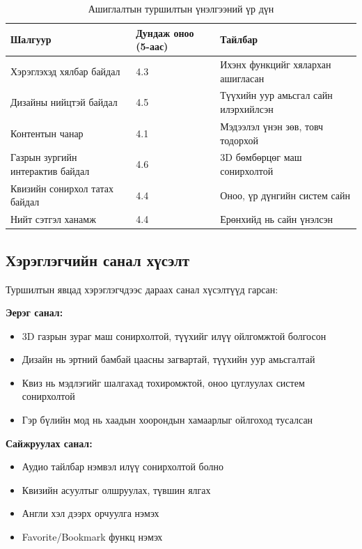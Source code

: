 \begin{table}[htbp]
\centering
\begin{tabular}{|p{5cm}|p{2.5cm}|p{6cm}|}
\hline
\textbf{Шалгуур} & \textbf{Дундаж оноо (5-аас)} & \textbf{Тайлбар} \\
\hline
Хэрэглэхэд хялбар байдал & 4.3 & Ихэнх функцийг хялархан ашигласан \\
\hline
Дизайны нийцтэй байдал & 4.5 & Түүхийн уур амьсгал сайн илэрхийлсэн \\
\hline
Контентын чанар & 4.1 & Мэдээлэл үнэн зөв, товч тодорхой \\
\hline
Газрын зургийн интерактив байдал & 4.6 & 3D бөмбөрцөг маш сонирхолтой \\
\hline
Квизийн сонирхол татах байдал & 4.4 & Оноо, үр дүнгийн систем сайн \\
\hline
Нийт сэтгэл ханамж & 4.4 & Ерөнхийд нь сайн үнэлсэн \\
\hline
\end{tabular}
\caption{Ашиглалтын туршилтын үнэлгээний үр дүн}
\label{tab:usability_results}
\end{table}

\subsection{Хэрэглэгчийн санал хүсэлт}

Туршилтын явцад хэрэглэгчдээс дараах санал хүсэлтүүд гарсан:

\textbf{Эерэг санал:}
\begin{itemize}
	\item 3D газрын зураг маш сонирхолтой, түүхийг илүү ойлгомжтой болгосон
	\item Дизайн нь эртний бамбай цаасны загвартай, түүхийн уур амьсгалтай
	\item Квиз нь мэдлэгийг шалгахад тохиромжтой, оноо цуглуулах систем сонирхолтой
	\item Гэр бүлийн мод нь хаадын хоорондын хамаарлыг ойлгоход тусалсан
\end{itemize}

\textbf{Сайжруулах санал:}
\begin{itemize}
	\item Аудио тайлбар нэмвэл илүү сонирхолтой болно
	\item Квизийн асуултыг олшруулах, түвшин ялгах
	\item Англи хэл дээрх орчуулга нэмэх
	\item Favorite/Bookmark функц нэмэх
\end{itemize}

